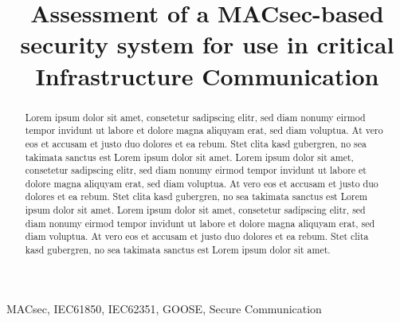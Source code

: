 \documentclass[conference]{IEEEtran}
\begin{document}
\title{Assessment of a MACsec-based security system for use in critical Infrastructure Communication}

\author{
}

\maketitle

\begin{abstract}
    Lorem ipsum dolor sit amet, consetetur sadipscing elitr, sed diam nonumy eirmod tempor invidunt ut labore et dolore magna aliquyam erat, sed diam 
    voluptua. At vero eos et accusam et justo duo dolores et ea rebum. Stet clita kasd gubergren, no sea takimata sanctus est Lorem ipsum dolor sit 
    amet. Lorem ipsum dolor sit amet, consetetur sadipscing elitr, sed diam nonumy eirmod tempor invidunt ut labore et dolore magna aliquyam erat, sed 
    diam voluptua. At vero eos et accusam et justo duo dolores et ea rebum. Stet clita kasd gubergren, no sea takimata sanctus est Lorem ipsum dolor 
    sit amet. Lorem ipsum dolor sit amet, consetetur sadipscing elitr, sed diam nonumy eirmod tempor invidunt ut labore et dolore magna aliquyam erat, 
    sed diam voluptua. At vero eos et accusam et justo duo dolores et ea rebum. Stet clita kasd gubergren, no sea takimata sanctus est Lorem ipsum dolor 
    sit amet.
\end{abstract}

\begin{IEEEkeywords}
    MACsec, IEC61850, IEC62351, GOOSE, Secure Communication
\end{IEEEkeywords}

\end{document}
